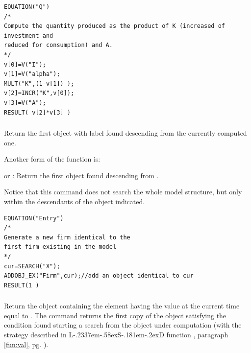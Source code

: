 \documentclass [11pt,a4paper] {book}
\def\LsD{{L\kern-.2337em\lower-.58ex\hbox{S}\kern-.181em\lower-.2ex\hbox{D}}\xspace}
\begin{document}
 \small
\begin{verbatim}
EQUATION("Q")
/*
Compute the quantity produced as the product of K (increased of investment and
reduced for consumption) and A.
*/
v[0]=V("I");
v[1]=V("alpha");
MULT("K",(1-v[1]) );
v[2]=INCR("K",v[0]);
v[3]=V("A");
RESULT( v[2]*v[3] )
\end{verbatim}
\normalsize

\subsubsection{ }\label{fun:search}
Return the first object with label  found descending from the currently computed one.

Another form of the function is:
\begin{list}{-}{\itemsep -0.2cm}
\item {} or : Return the first object  found descending from .

\end{list}

Notice that this command does not search the whole model structure, but only within the descendants of the object indicated.


 \small
\begin{verbatim}
EQUATION("Entry")
/*
Generate a new firm identical to the
first firm existing in the model
*/
cur=SEARCH("X");
ADDOBJ_EX("Firm",cur);//add an object identical to cur
RESULT(1 )

\end{verbatim}
\normalsize

\subsubsection{ }
Return the object containing the element  having the value at the current time equal to . The command returns the first copy of the object satisfying the condition found starting a search from the object under computation (with the strategy described in \LsD function , paragraph \ref{fun:val}, pg. \pageref{fun:val}).
\end{document}
